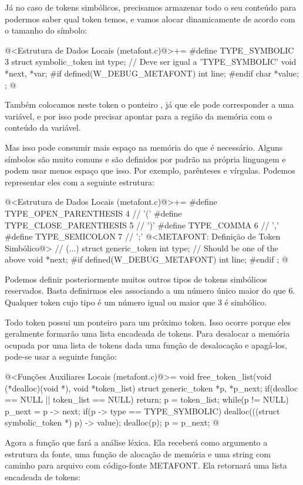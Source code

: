 Já no caso de tokens simbólicos, precisamos armazenar todo o seu
conteúdo para podermos saber qual token temos, e vamos alocar
dinamicamente de acordo com o tamanho do símbolo:

\iniciocodigo
@<Estrutura de Dados Locais (metafont.c)@>+=
#define TYPE_SYMBOLIC 3
struct symbolic_token{
  int type;   // Deve ser igual a 'TYPE_SYMBOLIC'
  void *next, *var;
#if defined(W_DEBUG_METAFONT)
  int line;
#endif
  char *value;
};
@
\fimcodigo

Também colocamos neste token o ponteiro , já que ele
pode corresponder a uma variável, e por isso pode precisar apontar
para a região da memória com o conteúdo da variável.

Mas isso pode consumir mais espaço na memória do que é
necessário. Alguns símbolos são muito comuns e são definidos por
padrão na própria linguagem e podem usar menos espaço que isso. Por
exemplo, parênteses e vírgulas. Podemos representar eles com a
seguinte estrutura:

\iniciocodigo
@<Estrutura de Dados Locais (metafont.c)@>+=
#define TYPE_OPEN_PARENTHESIS  4 // '('
#define TYPE_CLOSE_PARENTHESIS 5 // ')'
#define TYPE_COMMA             6 // ','
#define TYPE_SEMICOLON         7 // ';'
@<METAFONT: Definição de Token Simbólico@>
// (...)
struct generic_token{
  int type;   // Should be one of the above
  void *next;
#if defined(W_DEBUG_METAFONT)
  int line;
#endif
};
@
\fimcodigo

Podemos definir posteriormente muitos outros tipos de tokens
simbólicos reservados. Basta definirmos eles associando a um número
único maior do que 6. Qualquer token cujo tipo é um número igual ou
maior que 3 é simbólico.

Todo token possui um ponteiro para um próximo token. Isso ocorre
porque eles geralmente formarão uma lista encadeada de tokens. Para
desalocar a memória ocupada por uma lista de tokens dada uma função de
desalocação e apagá-los, pode-se usar a seguinte função:

\iniciocodigo
@<Funções Auxiliares Locais (metafont.c)@>=
void free_token_list(void (*dealloc)(void *), void *token_list){
  struct generic_token *p, *p_next;
  if(dealloc == NULL || token_list == NULL)
    return;
  p = token_list;
  while(p != NULL){
    p_next = p -> next;
    if(p -> type == TYPE_SYMBOLIC)
      dealloc(((struct symbolic_token *) p) -> value);
    dealloc(p);
    p = p_next;
  }
}
@
\fimcodigo

Agora a função que fará a análise léxica. Ela receberá como argumento
a estrutura da fonte, uma função de alocação de memória e uma string
com caminho para arquivo com código-fonte METAFONT. Ela retornará uma
lista encadeada de tokens:

